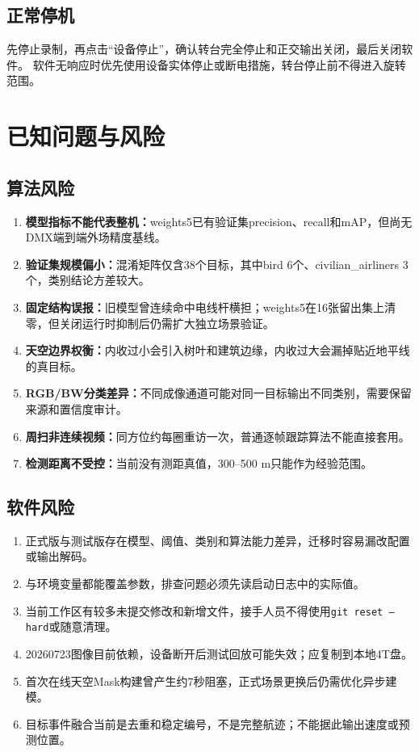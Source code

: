 \documentclass[UTF8,a4paper,11pt,openany]{ctexrep}
\begin{document}
\section{正常停机}

先停止录制，再点击“设备停止”，确认转台完全停止和正交输出关闭，最后关闭软件。
软件无响应时优先使用设备实体停止或断电措施，转台停止前不得进入旋转范围。

\chapter{已知问题与风险}

\section{算法风险}

\begin{enumerate}
  \item \textbf{模型指标不能代表整机：}weights5已有验证集precision、recall和mAP，但尚无DMX端到端外场精度基线。
  \item \textbf{验证集规模偏小：}混淆矩阵仅含38个目标，其中bird 6个、civilian\_airliners 3个，类别结论方差较大。
  \item \textbf{固定结构误报：}旧模型曾连续命中电线杆横担；weights5在16张留出集上清零，但关闭运行时抑制后仍需扩大独立场景验证。
  \item \textbf{天空边界权衡：}内收过小会引入树叶和建筑边缘，内收过大会漏掉贴近地平线的真目标。
  \item \textbf{RGB/BW分类差异：}不同成像通道可能对同一目标输出不同类别，需要保留来源和置信度审计。
  \item \textbf{周扫非连续视频：}同方位约每圈重访一次，普通逐帧跟踪算法不能直接套用。
  \item \textbf{检测距离不受控：}当前没有测距真值，300--500 m只能作为经验范围。
\end{enumerate}

\section{软件风险}

\begin{enumerate}
  \item 正式版与测试版存在模型、阈值、类别和算法能力差异，迁移时容易漏改配置或输出解码。
  \item {}与环境变量都能覆盖参数，排查问题必须先读启动日志中的实际值。
  \item 当前工作区有较多未提交修改和新增文件，接手人员不得使用\texttt{git reset --hard}或随意清理。
  \item 20260723图像目前依赖，设备断开后测试回放可能失效；应复制到本地4T盘。
  \item 首次在线天空Mask构建曾产生约7秒阻塞，正式场景更换后仍需优化异步建模。
  \item 目标事件融合当前是去重和稳定编号，不是完整航迹；不能据此输出速度或预测位置。
\end{enumerate}
\end{document}
